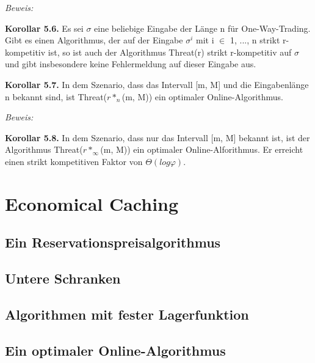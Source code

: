 \textit{Beweis:} 

\textbf{Korollar 5.6.} Es sei $\sigma$ eine beliebige Eingabe der Länge n für One-Way-Trading. Gibt es einen Algorithmus, der auf der Eingabe $\sigma^{i}$ mit i $\in$ {1, ..., n} strikt r-kompetitiv ist, so ist auch der Algorithmus Threat(r) strikt r-kompetitiv auf $\sigma$ und gibt insbesondere keine Fehlermeldung auf dieser Eingabe aus.

\textbf{Korollar 5.7.} In dem Szenario, dass das Intervall [m, M] und die Eingabenlänge n bekannt sind, ist Threat($r*_{n}$(m, M)) ein optimaler Online-Algorithmus.

\textit{Beweis:} 

\textbf{Korollar 5.8.} In dem Szenario, dass nur das Intervall [m, M] bekannt ist, ist der Algorithmus Threat($r*_{\infty}$(m, M)) ein optimaler Online-Alforithmus. Er erreicht einen strikt kompetitiven Faktor von $\Theta(log \varphi)$. 

\section{Economical Caching}

\subsection{Ein Reservationspreisalgorithmus}

\subsection{Untere Schranken}

\subsection{Algorithmen mit fester Lagerfunktion}

\subsection{Ein optimaler Online-Algorithmus}
